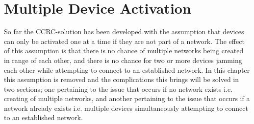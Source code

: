 \chapter{Multiple Device Activation}\label{chap:MDA-CCRC}
So far the CCRC-solution has been developed with the assumption that devices can only be activated one at a time if they are not part of a network.
The effect of this assumption is that there is no chance of multiple networks being created in range of each other, and there is no chance for two or more devices jamming each other while attempting to connect to an established network.
In this chapter this assumption is removed and the complications this brings will be solved in two sections; one pertaining to the issue that occurs if no network exists i.e. creating of multiple networks, and another pertaining to the issue that occurs if a network already exists i.e. multiple devices simultaneously attempting to connect to an established network.

